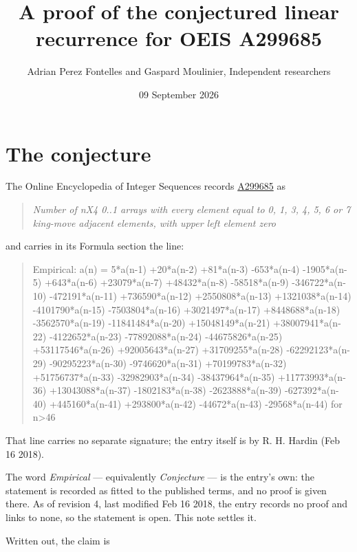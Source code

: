 \documentclass[11pt]{article}
\title{A proof of the conjectured linear recurrence for OEIS A299685}
\author{Adrian Perez Fontelles and Gaspard Moulinier, Independent researchers}
\date{09 September 2026}
\theoremstyle{definition}
\begin{document}
\maketitle
\section{The conjecture}

The Online Encyclopedia of Integer Sequences records \href{https://oeis.org/A299685}{A299685} as

\begin{quote}\itshape Number of nX4 0..1 arrays with every element equal to 0, 1, 3, 4, 5, 6 or 7 king-move adjacent elements, with upper left element zero\end{quote}

and carries in its Formula section the line:

\begin{quote}\ttfamily Empirical: a(n) = 5*a(n-1) +20*a(n-2) +81*a(n-3) -653*a(n-4) -1905*a(n-5) +643*a(n-6) +23079*a(n-7) +48432*a(n-8) -58518*a(n-9) -346722*a(n-10) -472191*a(n-11) +736590*a(n-12) +2550808*a(n-13) +1321038*a(n-14) -4101790*a(n-15) -7503804*a(n-16) +3021497*a(n-17) +8448688*a(n-18) -3562570*a(n-19) -11841484*a(n-20) +15048149*a(n-21) +38007941*a(n-22) -4122652*a(n-23) -77892088*a(n-24) -44675826*a(n-25) +53117546*a(n-26) +92005643*a(n-27) +31709255*a(n-28) -62292123*a(n-29) -90295223*a(n-30) -9746620*a(n-31) +70199783*a(n-32) +51756737*a(n-33) -32982903*a(n-34) -38437964*a(n-35) +11773993*a(n-36) +13043088*a(n-37) -1802183*a(n-38) -2623888*a(n-39) -627392*a(n-40) +445160*a(n-41) +293800*a(n-42) -44672*a(n-43) -29568*a(n-44) for n>46\end{quote}

That line carries no separate signature; the entry itself is by R. H. Hardin (Feb 16 2018).

The word {\itshape Empirical} --- equivalently {\itshape Conjecture} --- is the entry's own: the statement is recorded as fitted to the published terms, and no proof is given there. As of revision 4, last modified Feb 16 2018, the entry records no proof and links to none, so the statement is open. This note settles it.

Written out, the claim is
\end{document}
